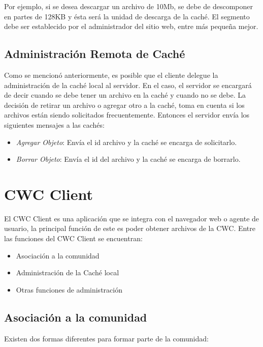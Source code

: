 Por ejemplo, si se desea descargar un archivo de 10Mb, se debe de descomponer en partes de 128KB y ésta será la unidad de descarga de la caché. El segmento debe ser establecido por el administrador del sitio web, entre más pequeña mejor.

\subsection{Administración Remota de Caché}

Como se mencionó anteriormente, es posible que el cliente delegue la administración de la caché local al servidor. En el caso, el servidor se encargará de decir cuando se debe tener un archivo en la caché y cuando no se debe. La decisión de retirar un archivo o agregar otro a la caché, toma en cuenta si los archivos están siendo solicitados frecuentemente. Entonces el servidor envía los siguientes mensajes a las cachés:

\begin{itemize}
\item \textit{Agregar Objeto}: Envía el id archivo y la caché se encarga de solicitarlo.
\item \textit{Borrar Objeto}: Envía el id del archivo y la caché se encarga de borrarlo.
\end{itemize}

\section{CWC Client}
El CWC Client es una aplicación que se integra con el navegador web o agente de usuario, la principal función de este es poder obtener archivos de la CWC.  Entre las funciones del CWC Client se encuentran:

\begin{itemize}
\item Asociación a la comunidad
\item Administración de la Caché local
\item Otras funciones de administración
\end{itemize}

\subsection{Asociación a la comunidad}

Existen dos formas diferentes para formar parte de la comunidad:

